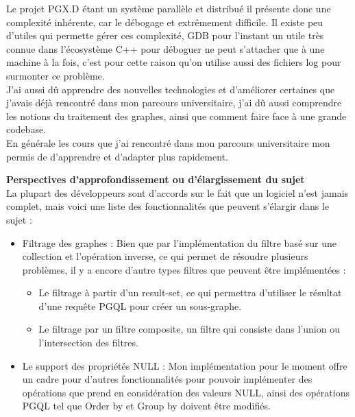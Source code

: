 Le projet PGX.D étant un système parallèle et distribué il présente donc une complexité inhérente, car le débogage et extrêmement difficile. Il existe peu d’utiles qui permette gérer ces complexité, GDB pour l’instant un utile très connue dans l’écosystème C++ pour déboguer ne peut s’attacher que à une machine à la fois, c’est pour cette raison qu’on utilise aussi des fichiers log pour surmonter ce problème.\\
J’ai aussi dû apprendre des nouvelles technologies et d’améliorer certaines que j’avais déjà rencontré dans mon parcours universitaire, j’ai dû aussi comprendre les notions du traitement des graphes, ainsi que comment faire face à une grande codebase.\\
En générale les cours que j’ai rencontré dans mon parcours universitaire mon permis de d’apprendre et d’adapter plus rapidement.

\textbf{Perspectives d'approfondissement ou d'élargissement du sujet}\\

La plupart des développeurs sont d’accords sur le fait que un logiciel n’est jamais complet, mais voici une liste des fonctionnalités que peuvent s’élargir dans le sujet :
\begin{itemize}[label=\textbullet]
\item Filtrage des graphes : Bien que par l’implémentation du filtre basé sur une collection et l’opération inverse, ce qui permet de résoudre plusieurs problèmes, il y a encore d’autre types filtres que peuvent être implémentées :
    \begin{itemize}
    \item Le filtrage à partir d’un result-set, ce qui permettra d’utiliser le résultat d’une requête PGQL pour créer un sous-graphe.
    \item Le filtrage par un filtre composite, un filtre qui consiste dans l’union ou l’intersection des filtres.
    \end{itemize}
\item Le support des propriétés NULL : Mon implémentation pour le moment offre un cadre pour d’autres fonctionnalités pour pouvoir implémenter des opérations que prend en considération des valeurs NULL, ainsi des opérations PGQL tel que Order by  et Group by doivent être modifiés.
\end{itemize}
